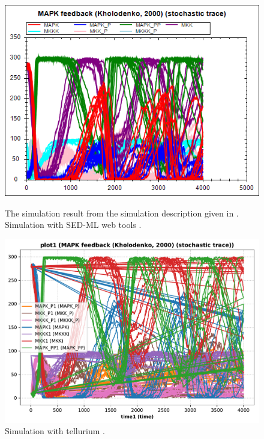 \begin{figure}[ht]
    \centering
    \begin{minipage}{0.47\textwidth}
        \centering
        \includegraphics[width=1.0\textwidth]{examples/repeated-stochastic-runs/results/sedml_webtools/plot1}
        \caption{The simulation result from the simulation description given in . Simulation with SED-ML web tools \citep{bergmann2017sed}.}
    \end{minipage}\hfill
    \begin{minipage}{0.47\textwidth}
        \centering
        \includegraphics[width=1.0\textwidth]{examples/repeated-stochastic-runs/results/tellurium/plot1}
        \caption{Simulation with tellurium \citep{tellurium}.}
    \end{minipage}
    \label{fig:repeated-stochastic-runs}
\end{figure}

